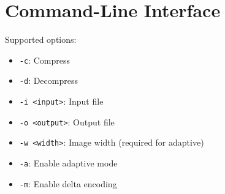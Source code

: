 \documentclass[a4paper,12pt]{article}
\begin{document}


    \section{Command-Line Interface}
    Supported options:
    \begin{itemize}
        \item \texttt{-c}: Compress
        \item \texttt{-d}: Decompress
        \item \texttt{-i <input>}: Input file
        \item \texttt{-o <output>}: Output file
        \item \texttt{-w <width>}: Image width (required for adaptive)
        \item \texttt{-a}: Enable adaptive mode
        \item \texttt{-m}: Enable delta encoding
    \end{itemize}

\end{document}
